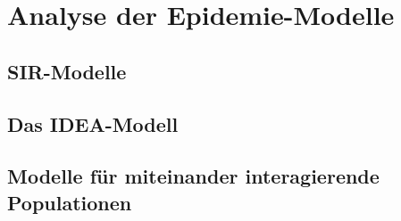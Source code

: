 \section{Analyse der Epidemie-Modelle}
\subsection{SIR-Modelle}

\subsection{Das IDEA-Modell}

\subsection{Modelle für miteinander interagierende Populationen}